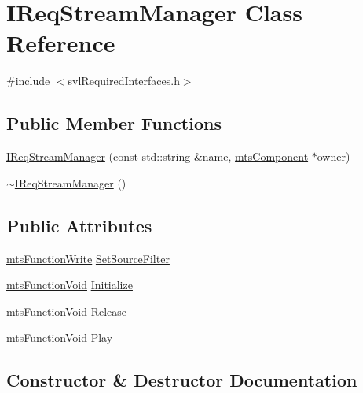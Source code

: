 \hypertarget{class_i_req_stream_manager}{}\section{I\+Req\+Stream\+Manager Class Reference}
\label{class_i_req_stream_manager}


{\ttfamily \#include $<$svl\+Required\+Interfaces.\+h$>$}

\subsection*{Public Member Functions}
\begin{DoxyCompactItemize}
\item 
\hyperlink{class_i_req_stream_manager_a6bb22b914d1b3c14a3f09f683336fdfa}{I\+Req\+Stream\+Manager} (const std\+::string \&name, \hyperlink{classmts_component}{mts\+Component} $\ast$owner)
\item 
\hyperlink{class_i_req_stream_manager_a0b01f893e54a0971a196df1e9e8f8df4}{$\sim$\+I\+Req\+Stream\+Manager} ()
\end{DoxyCompactItemize}
\subsection*{Public Attributes}
\begin{DoxyCompactItemize}
\item 
\hyperlink{classmts_function_write}{mts\+Function\+Write} \hyperlink{class_i_req_stream_manager_a1574c68fc18c8006f65360a0f7022e53}{Set\+Source\+Filter}
\item 
\hyperlink{classmts_function_void}{mts\+Function\+Void} \hyperlink{class_i_req_stream_manager_ae9d510716e9fefb79d95a727ac939f86}{Initialize}
\item 
\hyperlink{classmts_function_void}{mts\+Function\+Void} \hyperlink{class_i_req_stream_manager_a2f12fc26563af9bb3e035f7758cee301}{Release}
\item 
\hyperlink{classmts_function_void}{mts\+Function\+Void} \hyperlink{class_i_req_stream_manager_ad11164304990fd48f0e5ffb2fc3a75cf}{Play}
\end{DoxyCompactItemize}


\subsection{Constructor \& Destructor Documentation}
\hypertarget{class_i_req_stream_manager_a6bb22b914d1b3c14a3f09f683336fdfa}{}
